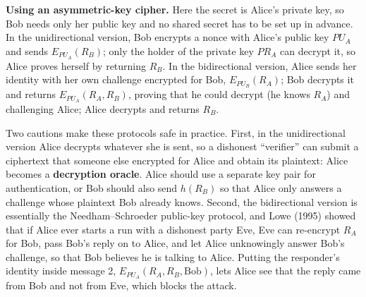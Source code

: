 \textbf{Using an asymmetric-key cipher.} Here the secret is Alice's private key, so Bob needs only her public key and no shared secret has to be set up in advance. In the unidirectional version, Bob encrypts a nonce with Alice's public key $PU_A$ and sends $E_{PU_A}(R_B)$; only the holder of the private key $PR_A$ can decrypt it, so Alice proves herself by returning $R_B$. In the bidirectional version, Alice sends her identity with her own challenge encrypted for Bob, $E_{PU_B}(R_A)$; Bob decrypts it and returns $E_{PU_A}(R_A, R_B)$, proving that he could decrypt (he knows $R_A$) and challenging Alice; Alice decrypts and returns $R_B$.
\begin{center}
\hspace{1.2cm}%
\end{center}
Two cautions make these protocols safe in practice. First, in the unidirectional version Alice decrypts whatever she is sent, so a dishonest ``verifier'' can submit a ciphertext that someone else encrypted for Alice and obtain its plaintext: Alice becomes a \textbf{decryption oracle}. Alice should use a separate key pair for authentication, or Bob should also send $h(R_B)$ so that Alice only answers a challenge whose plaintext Bob already knows. Second, the bidirectional version is essentially the Needham--Schroeder public-key protocol, and Lowe (1995) showed that if Alice ever starts a run with a dishonest party Eve, Eve can re-encrypt $R_A$ for Bob, pass Bob's reply on to Alice, and let Alice unknowingly answer Bob's challenge, so that Bob believes he is talking to Alice. Putting the responder's identity inside message 2, $E_{PU_A}(R_A, R_B, \text{Bob})$, lets Alice see that the reply came from Bob and not from Eve, which blocks the attack.

